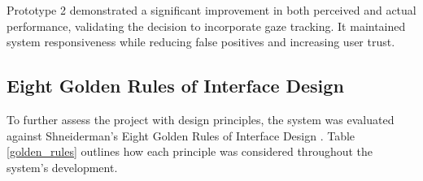 \documentclass[12pt]{article}
\theoremstyle{plain}
\theoremstyle{definition}
\begin{document}
Prototype 2 demonstrated a significant improvement in both perceived and actual performance, validating the decision to incorporate gaze tracking. It maintained system responsiveness while reducing false positives and increasing user trust.

\subsection{Eight Golden Rules of Interface Design}
\label{8_golden_rules}

To further assess the project with design principles, the system was evaluated against Shneiderman’s Eight Golden Rules of Interface Design \cite{ben_shneiderman_ben_nodate}. Table \ref{golden_rules} outlines how each principle was considered throughout the system’s development.
\end{document}
